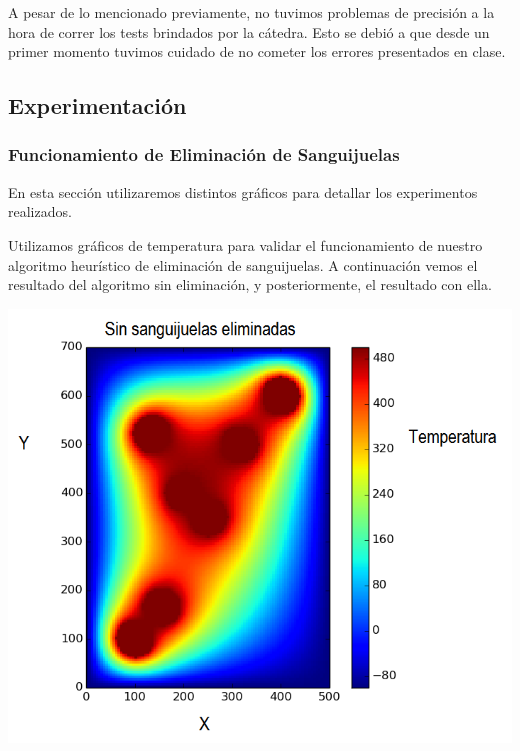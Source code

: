 A pesar de lo mencionado previamente, no tuvimos problemas de precisión a la hora de correr los tests brindados por la cátedra. Esto se debió a que desde un primer momento tuvimos cuidado de no cometer los errores presentados en clase. 


\subsection{Experimentación}
\subsubsection{Funcionamiento de Eliminación de Sanguijuelas}
	En esta sección utilizaremos distintos gráficos para detallar los experimentos realizados. 

	Utilizamos gráficos de temperatura para validar el funcionamiento de nuestro algoritmo heurístico de eliminación de sanguijuelas. A continuación vemos el resultado del algoritmo sin eliminación, y posteriormente, el resultado con ella.

	\begin{center}
		\includegraphics[scale=0.5]{./img/test5_sinkill.png}
	\end{center}

